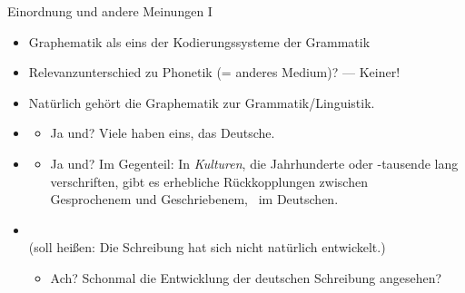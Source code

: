 \begin{frame}
  {Einordnung und andere Meinungen I}
  \pause
  \begin{itemize}[<+->]
    \item Graphematik als eins der \alert{Kodierungssysteme der Grammatik}
    \item Relevanzunterschied zu Phonetik (= anderes Medium)? --- \alert{Keiner!}
    \item \alert{Natürlich gehört die Graphematik zur Grammatik\slash Linguistik.}
    \Zeile
    \item {}
      \begin{itemize}[<+->]
        \item \alert{Ja und? Viele haben eins, \zB das Deutsche.}
      \end{itemize}
      \Viertelzeile
    \item {}
      \begin{itemize}[<+->]
        \item \alert{Ja und? Im Gegenteil: In \textit{Kulturen}, die Jahrhunderte oder -tausende lang\\
        verschriften, gibt es erhebliche Rückkopplungen zwischen\\
        Gesprochenem und Geschriebenem, \zB\ im Deutschen.}
      \end{itemize}
      \Viertelzeile
    \item {}\\
      (soll heißen: Die Schreibung hat sich nicht natürlich entwickelt.)
      \begin{itemize}[<+->]
        \item \alert{Ach? Schonmal die Entwicklung der deutschen Schreibung angesehen?}
      \end{itemize}
  \end{itemize}
\end{frame}

